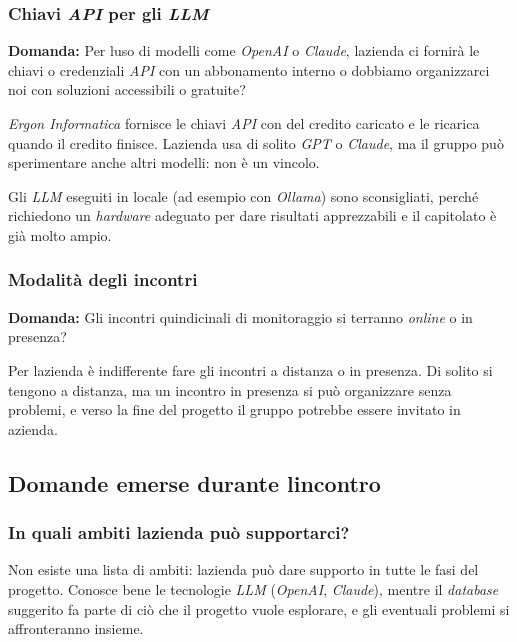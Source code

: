 \documentclass[12pt,a4paper]{article}
\begin{document}
\hypertarget{chiavi-api-per-gli-llm}{%
\subsubsection{\texorpdfstring{Chiavi \emph{API} per gli \emph{LLM}}{Chiavi API per gli LLM}}}

\textbf{Domanda:} Per l\textquotesingle uso di modelli come \emph{OpenAI} o \emph{Claude}, l\textquotesingle azienda ci fornirà le chiavi o credenziali \emph{API} con un abbonamento interno o dobbiamo organizzarci noi con soluzioni accessibili o gratuite?

\emph{Ergon Informatica} fornisce le chiavi \emph{API} con del credito caricato e le ricarica quando il credito finisce. L\textquotesingle azienda usa di solito \emph{GPT} o \emph{Claude}, ma il gruppo può sperimentare anche altri modelli: non è un vincolo.

Gli \emph{LLM} eseguiti in locale (ad esempio con \emph{Ollama}) sono sconsigliati, perché richiedono un \emph{hardware} adeguato per dare risultati apprezzabili e il capitolato è già molto ampio.

\hypertarget{modalituxe0-degli-incontri}{%
\subsubsection{Modalità degli incontri}}

\textbf{Domanda:} Gli incontri quindicinali di monitoraggio si terranno \emph{online} o in presenza?

Per l\textquotesingle azienda è indifferente fare gli incontri a distanza o in presenza. Di solito si tengono a distanza, ma un incontro in presenza si può organizzare senza problemi, e verso la fine del progetto il gruppo potrebbe essere invitato in azienda.

\hypertarget{domande-emerse-durante-lincontro}{%
\subsection{Domande emerse durante l\textquotesingle incontro}}

\hypertarget{in-quali-ambiti-lazienda-puuxf2-supportarci}{%
\subsubsection{In quali ambiti l\textquotesingle azienda può supportarci?}}

Non esiste una lista di ambiti: l\textquotesingle azienda può dare supporto in tutte le fasi del progetto. Conosce bene le tecnologie \emph{LLM} (\emph{OpenAI}, \emph{Claude}), mentre il \emph{database} suggerito fa parte di ciò che il progetto vuole esplorare, e gli eventuali problemi si affronteranno insieme.
\end{document}
